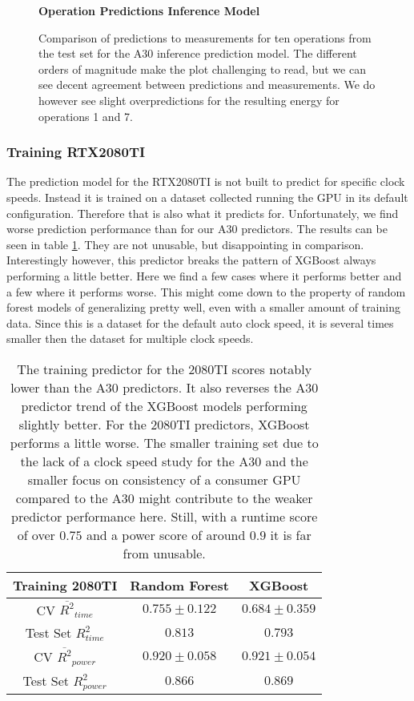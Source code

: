 \begin{figure}[htbp]
    \centering
    \parbox{1.1\textwidth}{\centering\textbf{Operation Predictions Inference Model}}
    \caption{Comparison of predictions to measurements for ten operations from the test set for the A30 inference prediction model. The different orders of magnitude make the plot challenging to read, but we can see decent agreement between predictions and measurements. We do however see slight overpredictions for the resulting energy for operations 1 and 7.}
    \label{fig:testsetops_inf}
\end{figure}


\subsubsection{Training RTX2080TI}

The prediction model for the RTX2080TI is not built to predict for specific clock speeds. Instead it is trained on a dataset collected running the GPU in its default configuration. Therefore that is also what it predicts for. Unfortunately, we find worse prediction performance than for our A30 predictors. The results can be seen in table \ref{tab:pred_res_2080}. They are not unusable, but disappointing in comparison. Interestingly however, this predictor breaks the pattern of XGBoost always performing a little better. Here we find a few cases where it performs better and a few where it performs worse. This might come down to the property of random forest models of generalizing pretty well, even with a smaller amount of training data. Since this is a dataset for the default auto clock speed, it is several times smaller then the dataset for multiple clock speeds. 

\begin{table}[h!]
\centering
\begin{tabular}{|c|c|c|}
\hline
 \textbf{Training 2080TI}& \textbf{Random Forest} & \textbf{XGBoost} \\
\hline
CV $\overline{R^2}_{time}$ & $0.755 \pm 0.122$ &  $0.684 \pm 0.359$ \\
\hline
Test Set $R^2_{time}$ & $0.813$ & $0.793$ \\
\hline
CV $\overline{R^2}_{power}$ & $0.920 \pm 0.058$  &  $0.921 \pm 0.054$\\
\hline
Test Set $R^2_{power}$ & $0.866$ & $0.869$ \\
\hline
\end{tabular}
\caption{The training predictor for the 2080TI scores notably lower than the A30 predictors. It also reverses the A30 predictor trend of the XGBoost models performing slightly better. For the 2080TI predictors, XGBoost performs a little worse. The smaller training set due to the lack of a clock speed study for the A30 and the smaller focus on consistency of a consumer GPU compared to the A30 might contribute to the weaker predictor performance here. Still, with a runtime score of over $0.75$ and a power score of around $0.9$ it is far from unusable.}
\label{tab:pred_res_2080}
\end{table}

